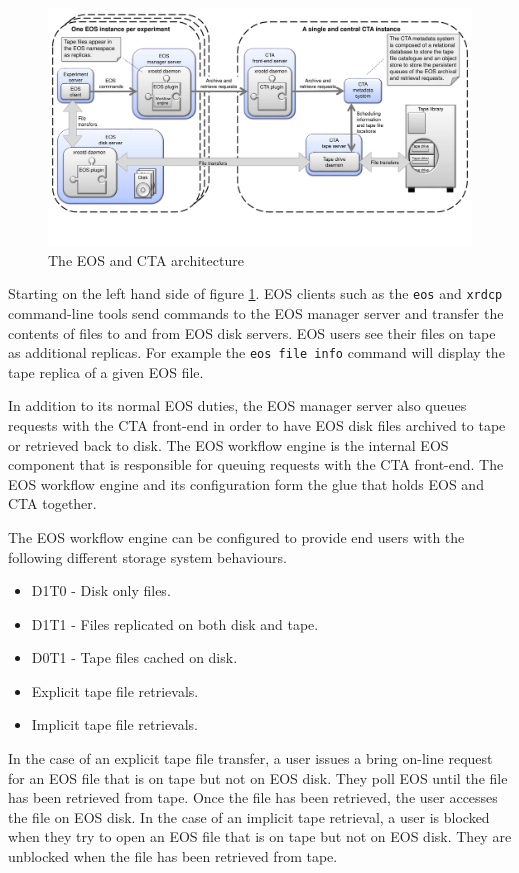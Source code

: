 \documentclass[a4paper]{jpconf}
\begin{document}
\begin{figure}[h]
\includegraphics[width=\textwidth, trim=0mm 35mm 0mm 0mm, clip]{CTA_architecture_A4.pdf}
\caption{\label{architecture}The EOS and CTA architecture}
\end{figure}

Starting on the left hand side of figure \ref{architecture}.  EOS clients such
as the \texttt{eos} and \texttt{xrdcp} command-line tools send commands to the
EOS manager server and transfer the contents of files to and from EOS disk
servers.  EOS users see their files on tape as additional replicas.  For example
the \texttt{eos file info} command will display the tape replica of a given EOS
file.

In addition to its normal EOS duties, the EOS manager server also queues
requests with the CTA front-end in order to have EOS disk files archived to tape
or retrieved back to disk.  The EOS workflow engine is the internal EOS
component that is responsible for queuing requests with the CTA front-end.  The
EOS workflow engine and its configuration form the glue that holds EOS and CTA
together.

The EOS workflow engine can be configured to provide end users with the
following different storage system behaviours.
\begin{itemize}
  \item D1T0 - Disk only files.
  \item D1T1 - Files replicated on both disk and tape.
  \item D0T1 - Tape files cached on disk.
  \item Explicit tape file retrievals.
  \item Implicit tape file retrievals.
\end{itemize}
In the case of an explicit tape file transfer, a user issues a bring on-line
request for an EOS file that is on tape but not on EOS disk.  They poll EOS
until the file has been retrieved from tape.  Once the file has been retrieved,
the user accesses the file on EOS disk.  In the case of an implicit tape
retrieval, a user is blocked when they try to open an EOS file that is on tape
but not on EOS disk.  They are unblocked when the file has been retrieved from
tape.
\end{document}
